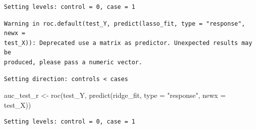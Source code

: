 \documentclass[
  letterpaper,
  DIV=11,
  numbers=noendperiod]{scrartcl}
\newenvironment{Shaded}{\begin{snugshade}}{\end{snugshade}}
\newcommand{\AttributeTok}[1]{\textcolor[rgb]{0.40,0.45,0.13}{#1}}
\newcommand{\DecValTok}[1]{\textcolor[rgb]{0.68,0.00,0.00}{#1}}
\newcommand{\FunctionTok}[1]{\textcolor[rgb]{0.28,0.35,0.67}{#1}}
\newcommand{\NormalTok}[1]{\textcolor[rgb]{0.00,0.23,0.31}{#1}}
\newcommand{\OtherTok}[1]{\textcolor[rgb]{0.00,0.23,0.31}{#1}}
\newcommand{\SpecialCharTok}[1]{\textcolor[rgb]{0.37,0.37,0.37}{#1}}
\newcommand{\StringTok}[1]{\textcolor[rgb]{0.13,0.47,0.30}{#1}}
\begin{document}
\begin{Shaded}
\end{Shaded}

\begin{verbatim}
Setting levels: control = 0, case = 1
\end{verbatim}

\begin{verbatim}
Warning in roc.default(test_Y, predict(lasso_fit, type = "response", newx =
test_X)): Deprecated use a matrix as predictor. Unexpected results may be
produced, please pass a numeric vector.
\end{verbatim}

\begin{verbatim}
Setting direction: controls < cases
\end{verbatim}

\begin{Shaded}
\begin{Highlighting}[]
\NormalTok{auc\_test\_r }\OtherTok{\textless{}{-}} \FunctionTok{roc}\NormalTok{(test\_Y, }\FunctionTok{predict}\NormalTok{(ridge\_fit, }\AttributeTok{type =} \StringTok{"response"}\NormalTok{, }\AttributeTok{newx =}\NormalTok{ test\_X))}
\end{Highlighting}
\end{Shaded}

\begin{verbatim}
Setting levels: control = 0, case = 1
\end{verbatim}
\end{document}
